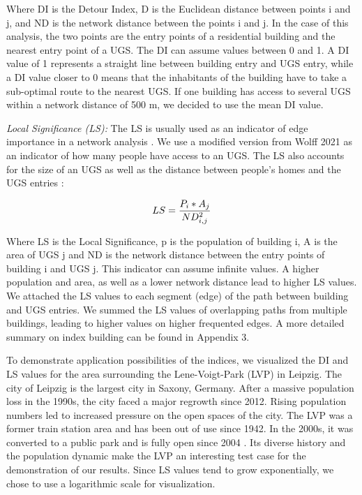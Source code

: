 \documentclass[10pt]{article}
\begin{document}
Where DI is the Detour Index, D is the Euclidean distance between points i and j, and ND is the network distance between the points i and j.
In the case of this analysis, the two points are the entry points of a residential building and the nearest entry point of a UGS.
The DI can assume values between 0 and 1.
A DI value of 1 represents a straight line between building entry and UGS entry, while a DI value closer to 0 means that the inhabitants of the building have to take a sub-optimal route to the nearest UGS.
If one building has access to several UGS within a network distance of 500 m, we decided to use the mean DI value.

\textit{Local Significance (LS):} The LS is usually used as an indicator of edge importance in a network analysis \citep{Esch.2014}.
We use a modified version from Wolff 2021 as an indicator of how many people have access to an UGS.
The LS also accounts for the size of an UGS as well as the distance between people’s homes and the UGS entries \citep{Wolff.2021}:

\begin{equation}
\centering
\large{LS = \frac{P_{i} * A_{j}}{ND^2_{i,j}}}
\end{equation}

Where LS is the Local Significance, p is the population of building i, A is the area of UGS j and ND is the network distance between the entry points of building i and UGS j.
This indicator can assume infinite values.
A higher population and area, as well as a lower network distance lead to higher LS values.
We attached the LS values to each segment (edge) of the path between building and UGS entries.
We summed the LS values of overlapping paths from multiple buildings, leading to higher values on higher frequented edges.
A more detailed summary on index building can be found in Appendix 3.

To demonstrate application possibilities of the indices, we visualized the DI and LS values for the area surrounding the Lene-Voigt-Park (LVP) in Leipzig.
The city of Leipzig is the largest city in Saxony, Germany. After a massive population loss in the 1990s, the city faced a major regrowth since 2012. Rising population numbers led to increased pressure on the open spaces of the city.
The LVP was a former train station area and has been out of use since 1942.
In the 2000s, it was converted to a public park and is fully open since 2004 \citep{Wolff.2017, StadtLeipzig.2022}.
Its diverse history and the population dynamic make the LVP an interesting test case for the demonstration of our results.
Since LS values tend to grow exponentially, we chose to use a logarithmic scale for visualization.
\end{document}
